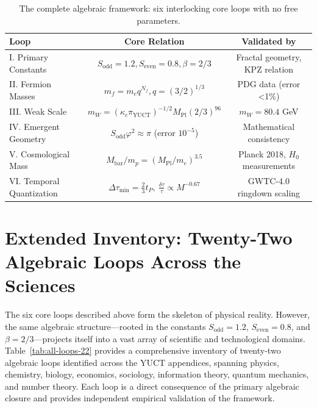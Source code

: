 \documentclass[12pt,a4paper]{article}
\begin{document}
	\begin{table}[htbp]
		\centering
		\caption{The complete algebraic framework: six interlocking core loops with no free parameters.}
		\label{tab:all-loops}
		\footnotesize
		\begin{tabular}{l c c}
			\toprule
			\textbf{Loop} & \textbf{Core Relation} & \textbf{Validated by} \\
			\midrule
			I. Primary Constants & \(S_{\mathrm{odd}}=1.2, S_{\mathrm{even}}=0.8, \beta=2/3\) & Fractal geometry, KPZ relation \\
			II. Fermion Masses & \(m_f = m_e q^{N_f}, q=(3/2)^{1/3}\) & PDG data (error <1\%) \\
			III. Weak Scale & \(m_W = (\kappa_c \pi_{\mathrm{YUCT}})^{-1/2} M_{\mathrm{Pl}} (2/3)^{96}\) & \(m_W = 80.4\) GeV \\
			IV. Emergent Geometry & \(S_{\mathrm{odd}}\varphi^2 \approx \pi\) (error \(10^{-5}\)) & Mathematical consistency \\
			V. Cosmological Mass & \(M_{\mathrm{bar}}/m_p = (M_{\mathrm{Pl}}/m_e)^{3.5}\) & Planck 2018, \(H_0\) measurements \\
			VI. Temporal Quantization & \(\Delta \tau_{\min} = \frac{2}{3} t_P, \ \frac{\delta \tau}{\tau} \propto M^{-0.67}\) & GWTC-4.0 ringdown scaling \\
			\bottomrule
		\end{tabular}
	\end{table}
	
	\section*{Extended Inventory: Twenty-Two Algebraic Loops Across the Sciences}
	
	The six core loops described above form the skeleton of physical reality. However, the same algebraic structure—rooted in the constants \(S_{\mathrm{odd}} = 1.2\), \(S_{\mathrm{even}} = 0.8\), and \(\beta = 2/3\)—projects itself into a vast array of scientific and technological domains. Table~\ref{tab:all-loops-22} provides a comprehensive inventory of twenty-two algebraic loops identified across the YUCT appendices, spanning physics, chemistry, biology, economics, sociology, information theory, quantum mechanics, and number theory. Each loop is a direct consequence of the primary algebraic closure and provides independent empirical validation of the framework.
	
\end{document}
